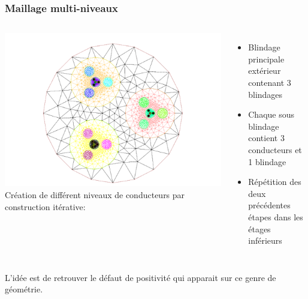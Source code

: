 \begin{frame}
    \frametitle{Maillage multi-niveaux}
    \begin{columns}[T]
        \centering
        \includegraphics[width=1.2\linewidth]{figures/figures/gui/mesh-2.pdf}
        Création de différent niveaux de conducteurs par construction itérative:
        \begin{itemize}
            \item Blindage principale extérieur contenant 3 blindages
            \item Chaque sous blindage contient 3 conducteurs et 1 blindage
            \item Répétition des deux précédentes étapes dans les étages inférieurs
        \end{itemize}
    \end{columns}
    L'idée est de retrouver le défaut de positivité qui apparait sur ce genre de géométrie.
\end{frame}

